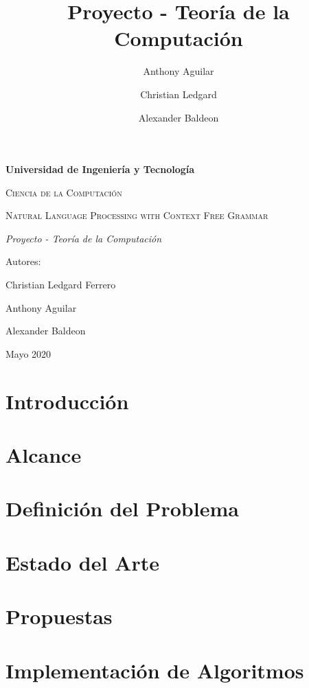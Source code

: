 \documentclass[12pt]{article}
\author{Anthony Aguilar \and Christian Ledgard \and Alexander Baldeon}
\title{Proyecto - Teoría de la Computación}
\begin{document}
  \begin{titlepage}
    \centering
    {\bfseries\LARGE Universidad de Ingeniería y Tecnología\par}
    \vspace{2cm}
    {\scshape\Large Ciencia de la Computación\par}
    \vspace{3cm}
    {\scshape\Huge Natural Language Processing with Context Free Grammar\par}
    \vspace{3cm}
    {\itshape\Large Proyecto - Teoría de la Computación\par}
    \vfill
    {\Large Autores: \par}
    {\Large Christian Ledgard Ferrero\par}
    {\Large Anthony Aguilar\par}
    {\Large Alexander Baldeon\par}
    \vfill
    {\Large Mayo 2020 \par}
  \end{titlepage}
  \thispagestyle{fancy}

\tableofcontents
\newpage

\section{Introducción}
 

\section{Alcance}


\section{Definición del Problema}


\section{Estado del Arte}


\section{Propuestas}

\newpage

\section{Implementación de Algoritmos}
\end{document}
